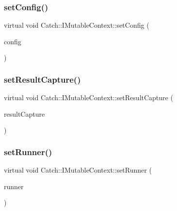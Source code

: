 \mbox{\label{struct_catch_1_1_i_mutable_context_aa81ba080fce084e9482f20338bc88531}} 
\subsubsection{setConfig()}
{\footnotesize\ttfamily virtual void Catch\+::\+I\+Mutable\+Context\+::set\+Config (\begin{DoxyParamCaption}\item[{\textbf{ I\+Config\+Ptr} const \&}]{config }\end{DoxyParamCaption})\hspace{0.3cm}{\ttfamily [pure virtual]}}

\mbox{\label{struct_catch_1_1_i_mutable_context_a4a80afd0525b7def21bee8d9b48f2d39}} 
\subsubsection{setResultCapture()}
{\footnotesize\ttfamily virtual void Catch\+::\+I\+Mutable\+Context\+::set\+Result\+Capture (\begin{DoxyParamCaption}\item[{\textbf{ I\+Result\+Capture} $\ast$}]{result\+Capture }\end{DoxyParamCaption})\hspace{0.3cm}{\ttfamily [pure virtual]}}

\mbox{\label{struct_catch_1_1_i_mutable_context_af2e53b1dea4527a2587cff266a730f6e}} 
\subsubsection{setRunner()}
{\footnotesize\ttfamily virtual void Catch\+::\+I\+Mutable\+Context\+::set\+Runner (\begin{DoxyParamCaption}\item[{\textbf{ I\+Runner} $\ast$}]{runner }\end{DoxyParamCaption})\hspace{0.3cm}{\ttfamily [pure virtual]}}



